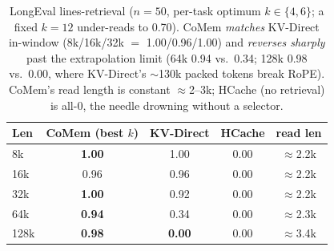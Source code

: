 \begin{table}[t]
\centering
\small
\setlength{\tabcolsep}{4pt}
\begin{tabular}{@{}lcccc@{}}
\toprule
\textbf{Len} & \textbf{CoMem} (best $k$) & \textbf{KV-Direct} & \textbf{HCache} & \textbf{read len} \\
\midrule
8k   & \textbf{1.00} & 1.00 & 0.00 & $\approx$2.2k \\
16k  & 0.96 & 0.96 & 0.00 & $\approx$2.2k \\
32k  & \textbf{1.00} & 0.92 & 0.00 & $\approx$2.2k \\
64k  & \textbf{0.94} & 0.34 & 0.00 & $\approx$2.3k \\
128k & \textbf{0.98} & \textbf{0.00} & 0.00 & $\approx$3.4k \\
\bottomrule
\end{tabular}
\caption{LongEval lines-retrieval ($n{=}50$, per-task optimum
$k\in\{4,6\}$; a fixed $k{=}12$ under-reads to 0.70). CoMem \emph{matches}
KV-Direct in-window (8k/16k/32k $=$ 1.00/0.96/1.00) and \emph{reverses sharply}
past the extrapolation limit (64k 0.94 vs.\ 0.34; 128k 0.98 vs.\ 0.00, where
KV-Direct's $\sim$130k packed tokens break RoPE). CoMem's read length is
constant $\approx$2--3k; HCache (no retrieval) is all-0, the needle drowning
without a selector.}
\label{tab:longeval}
\end{table}
